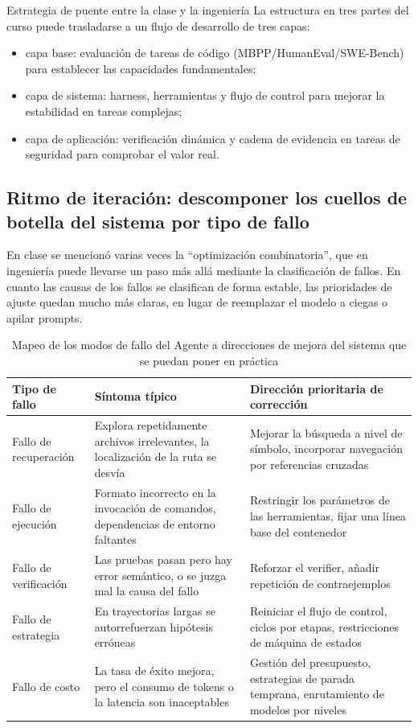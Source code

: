 \begin{knowledgebox}{Estrategia de puente entre la clase y la ingeniería}
La estructura en tres partes del curso puede trasladarse a un flujo de desarrollo de tres capas:
\begin{itemize}
    \item capa base: evaluación de tareas de código (MBPP/HumanEval/SWE-Bench) para establecer las capacidades fundamentales;
    \item capa de sistema: harness, herramientas y flujo de control para mejorar la estabilidad en tareas complejas;
    \item capa de aplicación: verificación dinámica y cadena de evidencia en tareas de seguridad para comprobar el valor real.
\end{itemize}
\end{knowledgebox}

\subsection{Ritmo de iteración: descomponer los cuellos de botella del sistema por tipo de fallo}
En clase se mencionó varias veces la ``optimización combinatoria'', que en ingeniería puede llevarse un paso más allá mediante la clasificación de fallos. En cuanto las causas de los fallos se clasifican de forma estable, las prioridades de ajuste quedan mucho más claras, en lugar de reemplazar el modelo a ciegas o apilar prompts.

\begin{table}[H]
\centering
\begin{tabular}{p{3.2cm}p{4.6cm}p{4.6cm}}
\toprule
\textbf{Tipo de fallo} & \textbf{Síntoma típico} & \textbf{Dirección prioritaria de corrección} \\
\midrule
Fallo de recuperación & Explora repetidamente archivos irrelevantes, la localización de la ruta se desvía & Mejorar la búsqueda a nivel de símbolo, incorporar navegación por referencias cruzadas \\
Fallo de ejecución & Formato incorrecto en la invocación de comandos, dependencias de entorno faltantes & Restringir los parámetros de las herramientas, fijar una línea base del contenedor \\
Fallo de verificación & Las pruebas pasan pero hay error semántico, o se juzga mal la causa del fallo & Reforzar el verifier, añadir repetición de contraejemplos \\
Fallo de estrategia & En trayectorias largas se autorrefuerzan hipótesis erróneas & Reiniciar el flujo de control, ciclos por etapas, restricciones de máquina de estados \\
Fallo de costo & La tasa de éxito mejora, pero el consumo de tokens o la latencia son inaceptables & Gestión del presupuesto, estrategias de parada temprana, enrutamiento de modelos por niveles \\
\bottomrule
\end{tabular}
\caption{Mapeo de los modos de fallo del Agente a direcciones de mejora del sistema que se puedan poner en práctica}
\end{table}

